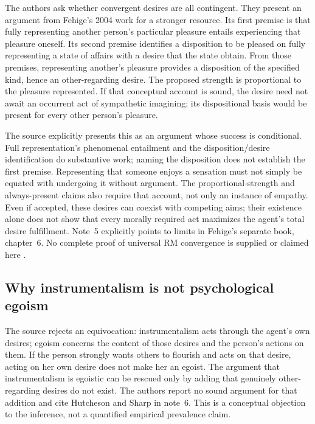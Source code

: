 The authors ask whether convergent desires are all contingent.
They present an argument from Fehige's 2004 work for a stronger
resource. Its first premise is that fully representing another
person's particular pleasure entails experiencing that pleasure
oneself. Its second premise identifies a disposition to be pleased
on fully representing a state of affairs with a desire that the
state obtain. From those premises, representing another's pleasure
provides a disposition of the specified kind, hence an other-regarding
desire. The proposed strength is proportional to the pleasure represented.
If that conceptual account is sound, the desire need not await an
occurrent act of sympathetic imagining; its dispositional basis
would be present for every other person's pleasure.

The source explicitly presents this as an argument whose success is
conditional. Full representation's phenomenal entailment and the
disposition/desire identification do substantive work; naming the
disposition does not establish the first premise. Representing that
someone enjoys a sensation must not simply be equated with undergoing
it without argument. The proportional-strength and always-present
claims also require that account, not only an instance of empathy.
Even if accepted, these desires can coexist with competing aims;
their existence alone does not show that every morally required
act maximizes the agent's total desire fulfillment. Note~5 explicitly
points to limits in Fehige's separate book, chapter~6. No complete
proof of universal RM convergence is supplied or claimed here
\parencite[p.~683 and n.~5]{FehigeWessels2021Morality}.

\subsection{Why instrumentalism is not psychological egoism}

The source rejects an equivocation: instrumentalism acts through
the agent's own desires; egoism concerns the content of those desires
and the person's actions on them. If the person strongly wants
others to flourish and acts on that desire, acting on her own desire
does not make her an egoist. The argument that instrumentalism is
egoistic can be rescued only by adding that genuinely other-regarding
desires do not exist. The authors report no sound argument for that
addition and cite Hutcheson and Sharp in note~6. This is a conceptual
objection to the inference, not a quantified empirical prevalence claim.

